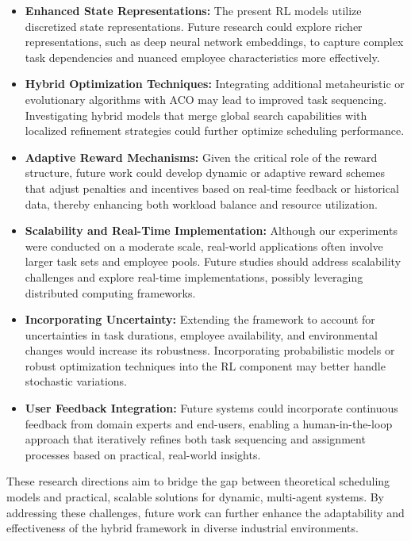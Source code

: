 \documentclass[conference]{IEEEtran}
\begin{document}
	\begin{itemize}
		\item \textbf{Enhanced State Representations:} The present RL models utilize
			discretized state representations. Future research could explore richer representations,
			such as deep neural network embeddings, to capture complex task dependencies
			and nuanced employee characteristics more effectively.

		\item \textbf{Hybrid Optimization Techniques:} Integrating additional
			metaheuristic or evolutionary algorithms with ACO may lead to improved
			task sequencing. Investigating hybrid models that merge global search capabilities
			with localized refinement strategies could further optimize scheduling performance.

		\item \textbf{Adaptive Reward Mechanisms:} Given the critical role of the
			reward structure, future work could develop dynamic or adaptive reward schemes
			that adjust penalties and incentives based on real-time feedback or historical
			data, thereby enhancing both workload balance and resource utilization.

		\item \textbf{Scalability and Real-Time Implementation:} Although our
			experiments were conducted on a moderate scale, real-world applications often
			involve larger task sets and employee pools. Future studies should address
			scalability challenges and explore real-time implementations, possibly leveraging
			distributed computing frameworks.

		\item \textbf{Incorporating Uncertainty:} Extending the framework to account
			for uncertainties in task durations, employee availability, and
			environmental changes would increase its robustness. Incorporating probabilistic
			models or robust optimization techniques into the RL component may better handle
			stochastic variations.

		\item \textbf{User Feedback Integration:} Future systems could incorporate
			continuous feedback from domain experts and end-users, enabling a human-in-the-loop
			approach that iteratively refines both task sequencing and assignment processes
			based on practical, real-world insights.
	\end{itemize}

	These research directions aim to bridge the gap between theoretical scheduling
	models and practical, scalable solutions for dynamic, multi-agent systems. By addressing
	these challenges, future work can further enhance the adaptability and
	effectiveness of the hybrid framework in diverse industrial environments.
\end{document}
